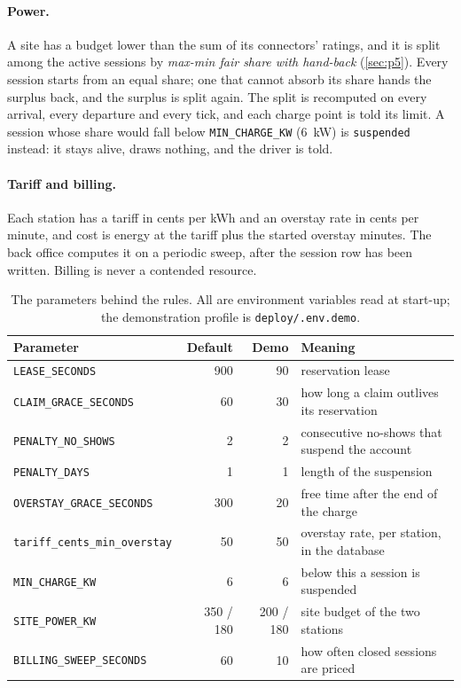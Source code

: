 \paragraph{Power.} A site has a budget lower than the sum of its connectors' ratings, and it
is split among the active sessions by \emph{max-min fair share with hand-back}
(\cref{sec:p5}). Every session starts from an equal share; one that cannot absorb its share
hands the surplus back, and the surplus is split again. The split is recomputed on
every arrival, every departure and every tick, and each charge point is told its limit. A
session whose share would fall below \texttt{MIN\_CHARGE\_KW} (6~kW) is \texttt{suspended}
instead: it stays alive, draws nothing, and the driver is told.

\paragraph{Tariff and billing.} Each station has a tariff in cents per kWh and an overstay
rate in cents per minute, and cost is energy at the tariff plus the started overstay
minutes. The back office computes it on a periodic sweep, after the session row has been
written. Billing is never a contended resource.

\begin{table}[h]
\centering\small
\renewcommand{\arraystretch}{1.15}
\caption{The parameters behind the rules. All are environment variables read at start-up;
the demonstration profile is \texttt{deploy/.env.demo}.}
\label{tab:params}
\begin{tabularx}{\textwidth}{@{}l r r X@{}}
\toprule
Parameter & Default & Demo & Meaning \\
\midrule
\texttt{LEASE\_SECONDS} & 900 & 90 & reservation lease \\
\texttt{CLAIM\_GRACE\_SECONDS} & 60 & 30 & how long a claim outlives its reservation \\
\texttt{PENALTY\_NO\_SHOWS} & 2 & 2 & consecutive no-shows that suspend the account \\
\texttt{PENALTY\_DAYS} & 1 & 1 & length of the suspension \\
\texttt{OVERSTAY\_GRACE\_SECONDS} & 300 & 20 & free time after the end of the charge \\
\texttt{tariff\_cents\_min\_overstay} & 50 & 50 & overstay rate, per station, in the database \\
\texttt{MIN\_CHARGE\_KW} & 6 & 6 & below this a session is suspended \\
\texttt{SITE\_POWER\_KW} & 350 / 180 & 200 / 180 & site budget of the two stations \\
\texttt{BILLING\_SWEEP\_SECONDS} & 60 & 10 & how often closed sessions are priced \\
\bottomrule
\end{tabularx}
\end{table}
